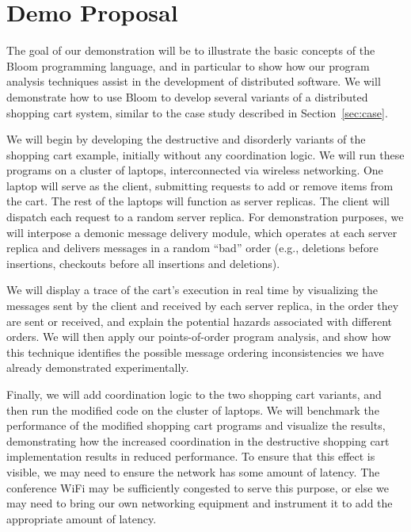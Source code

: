 \clearpage
\section{Demo Proposal}
\label{sec:demo}

The goal of our demonstration will be to illustrate the basic concepts of the
Bloom programming language, and in particular to show how our program analysis
techniques assist in the development of distributed software. We will
demonstrate how to use Bloom to develop several variants of a distributed
shopping cart system, similar to the case study described in
Section~\ref{sec:case}.

We will begin by developing the destructive and disorderly variants of the
shopping cart example, initially without any coordination logic. We will run
these programs on a cluster of laptops, interconnected via wireless
networking. One laptop will serve as the client, submitting requests to add or
remove items from the cart.  The rest of the laptops will function as server
replicas.  The client will dispatch each request to a random server replica.
For demonstration purposes, we will interpose a demonic message delivery module,
which operates at each server replica and delivers messages in a random ``bad''
order (e.g., deletions before insertions, checkouts before all insertions
and deletions).

We will display a trace of the cart's execution in real time by visualizing the
messages sent by the client and received by each server replica, in the order
they are sent or received, and explain the potential hazards associated with
different orders. We will then apply our points-of-order program analysis, and
show how this technique identifies the possible message ordering inconsistencies
we have already demonstrated experimentally.

Finally, we will add coordination logic to the two shopping cart variants, and
then run the modified code on the cluster of laptops. We will benchmark the
performance of the modified shopping cart programs and visualize the results,
demonstrating how the increased coordination in the destructive shopping cart
implementation results in reduced performance. To ensure that this effect is
visible, we may need to ensure the network has some amount of latency. The
conference WiFi may be sufficiently congested to serve this purpose, or else we
may need to bring our own networking equipment and instrument it to add the
appropriate amount of latency.
